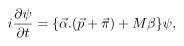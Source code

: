 \begin{equation}
\label{OD}
 i{\partial \psi \over \partial t} = \{\vec{\alpha }.(\vec{p} +
\vec{\pi }) + M\beta \}\psi ,
\end{equation}

